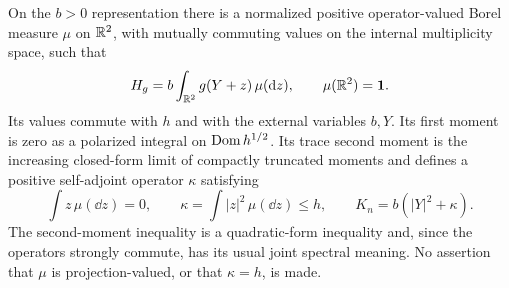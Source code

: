\begin{proposition}
\label{N:measure-proposition}
On the $b>0$ representation there is a normalized positive
operator-valued Borel measure $\mu$
on $\mathbb R^2$, with mutually commuting values on the internal
multiplicity space, such that
\begin{equation}\label{N:measure-representation}
 H_g=b\int_{\mathbb R^2}g(Y+z)\,\mu(\mathrm d z),
 \qquad \mu(\mathbb R^2)=\mathbf 1.
\end{equation}
Its values commute with $h$ and with the external variables $b,Y$.
Its first moment is zero as a polarized integral on
$\operatorname{Dom} h^{1/2}$. Its trace second moment is the increasing closed-form
limit of compactly truncated moments and defines a positive
self-adjoint operator $\kappa$ satisfying
\begin{equation}\label{N:moment-comparison}
 \int z\,\mu(\dd z)=0,\qquad
 \kappa=\int |z|^2\,\mu(\dd z)\leq h,
 \qquad K_n=b(|Y|^2+\kappa).
\end{equation}
The second-moment inequality is a quadratic-form inequality and,
since the operators strongly commute, has its usual joint
spectral meaning.  No assertion that $\mu$ is projection-valued,
or that $\kappa=h$, is made.
\end{proposition}

